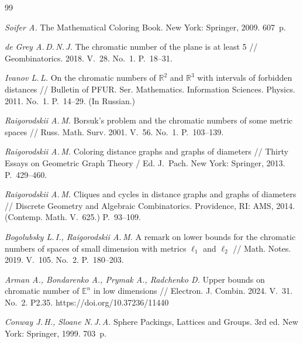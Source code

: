 \documentclass{article}
\theoremstyle{plain}
\theoremstyle{remark}
\newcommand{\R}{\mathbb{R}}
\begin{document}
\begin{thebibliography}{99}

\textit{Soifer A.}
The Mathematical Coloring Book. New York: Springer, 2009. 607~p.

\textit{de Grey A.\,D.\,N.\,J.}
The chromatic number of the plane is at least 5 //
Geombinatorics. 2018. V.~28. No.~1. P.~18--31.

\textit{Ivanov L.\,L.}
On the chromatic numbers of $\R^2$ and $\R^3$ with intervals of forbidden
distances // Bulletin of PFUR. Ser. Mathematics. Information Sciences.
Physics. 2011. No.~1. P.~14--29. (In Russian.)

\textit{Raigorodskii A.\,M.}
Borsuk's problem and the chromatic numbers of some metric spaces //
Russ. Math. Surv. 2001. V.~56. No.~1. P.~103--139.

\textit{Raigorodskii A.\,M.}
Coloring distance graphs and graphs of diameters // Thirty Essays on
Geometric Graph Theory / Ed. J.~Pach. New York: Springer, 2013. P.~429--460.

\textit{Raigorodskii A.\,M.}
Cliques and cycles in distance graphs and graphs of diameters // Discrete
Geometry and Algebraic Combinatorics. Providence, RI: AMS, 2014.
(Contemp. Math. V.~625.) P.~93--109.

\textit{Bogolubsky L.\,I., Raigorodskii A.\,M.}
A remark on lower bounds for the chromatic numbers of spaces of small
dimension with metrics $\ell_1$ and $\ell_2$ // Math. Notes. 2019.
V.~105. No.~2. P.~180--203.

\textit{Arman A., Bondarenko A., Prymak A., Radchenko D.}
Upper bounds on chromatic number of $\mathbb E^n$ in low dimensions //
Electron. J. Combin. 2024. V.~31. No.~2. P2.35.
https://doi.org/10.37236/11440

\textit{Conway J.\,H., Sloane N.\,J.\,A.}
Sphere Packings, Lattices and Groups. 3rd ed. New York: Springer, 1999.
703~p.

\end{thebibliography}
\end{document}

